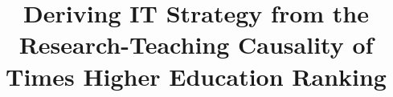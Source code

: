 \documentclass[a4paper, conference]{IEEEtran}
\begin{document}
%

\title{Deriving IT Strategy from the Research-Teaching Causality of Times Higher Education Ranking}
\end{document}
